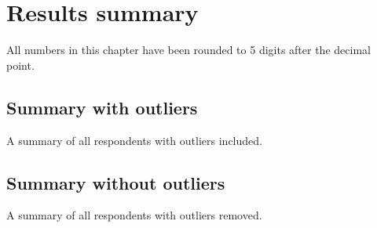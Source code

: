 \chapter{Results summary}
All numbers in this chapter have been rounded to 5 digits after the decimal point.

\section{Summary with outliers}
\begin{table}[H]
	\caption{A summary of all respondents with outliers included.}
	\label{table:outliersSummary}
	\begin{center}
		
	\end{center}
\end{table}

\section{Summary without outliers}
\begin{table}[H]
	\caption{A summary of all respondents with outliers removed.}
	\label{table:noOutliersSummary}
	\begin{center}
		
	\end{center}
\end{table}
